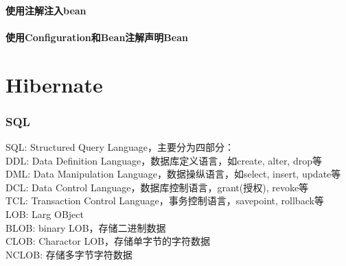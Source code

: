 \documentclass[a4paper,11pt]{article}
\begin{document}
\subsection[使用注解注入bean]{使用注解注入bean}

\subsection[使用Configuration和Bean注解声明Bean]{使用Configuration和Bean注解声明Bean}


\part[Hibernate]{Hibernate}

\section[SQL]{SQL}
SQL: Structured Query Language，主要分为四部分：\\[10pt]
DDL: Data Definition Language，数据库定义语言，如create, alter, drop等\\
DML: Data Manipulation Language，数据操纵语言，如select, insert, update等\\
DCL: Data Control Language，数据库控制语言，grant(授权), revoke等\\
TCL: Transaction Control Language，事务控制语言，savepoint, rollback等\\[10pt]

LOB: Larg OBject\\
BLOB: binary LOB，存储二进制数据\\
CLOB: Charactor LOB，存储单字节的字符数据\\
NCLOB: 存储多字节字符数据
\end{document}
